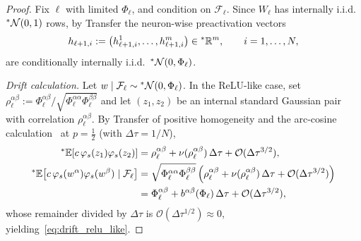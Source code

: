 \begin{proof}
Fix $\ell$ with limited $\Phi_\ell$, and condition on $\mathcal{F}_\ell$. Since $W_\ell$ has internally i.i.d.\ ${}^*\mathcal{N}(0,1)$ rows, by Transfer the neuron-wise preactivation vectors
\begin{equation}\label{eq:shaped_neuron_vec}
h_{\ell+1,i} := \left(h_{\ell+1,i}^1, \dots, h_{\ell+1,i}^m\right) \in {}^*\mathbb{R}^m, \qquad i = 1, \dots, N,
\end{equation}
are conditionally internally i.i.d.\ ${}^*\mathcal{N}(0, \Phi_\ell)$.

\medskip\noindent\emph{Drift calculation.}
Let $w \mid \mathcal{F}_\ell \sim {}^*\mathcal{N}(0, \Phi_\ell)$. In the ReLU-like case, set $\rho_\ell^{\alpha\beta} := \Phi_\ell^{\alpha\beta}/\sqrt{\Phi_\ell^{\alpha\alpha}\Phi_\ell^{\beta\beta}}$ and let $(z_1, z_2)$ be an internal standard Gaussian pair with correlation $\rho_\ell^{\alpha\beta}$. By Transfer of positive homogeneity and the arc-cosine calculation~\cite[Proposition~3.4]{li2022neural} at $p = \frac{1}{2}$ (with $\Delta\tau = 1/N$),
\begin{equation}\label{eq:relu_drift_calc}
\begin{aligned}
{}^*\mathbb{E}[c\,\varphi_s(z_1)\varphi_s(z_2)] &= \rho_\ell^{\alpha\beta} + \nu(\rho_\ell^{\alpha\beta})\,\Delta\tau + \mathcal{O}(\Delta\tau^{3/2}), \\
{}^*\mathbb{E}\!\left[c\,\varphi_s(w^\alpha)\varphi_s(w^\beta) \mid \mathcal{F}_\ell\right] &= \sqrt{\Phi_\ell^{\alpha\alpha}\Phi_\ell^{\beta\beta}}\left(\rho_\ell^{\alpha\beta} + \nu(\rho_\ell^{\alpha\beta})\,\Delta\tau + \mathcal{O}(\Delta\tau^{3/2})\right) \\
&= \Phi_\ell^{\alpha\beta} + b^{\alpha\beta}(\Phi_\ell)\,\Delta\tau + \mathcal{O}(\Delta\tau^{3/2}),
\end{aligned}
\end{equation}
whose remainder divided by $\Delta\tau$ is $\mathcal{O}(\Delta\tau^{1/2}) \approx 0$, yielding~\eqref{eq:drift_relu_like}.


\end{proof}
